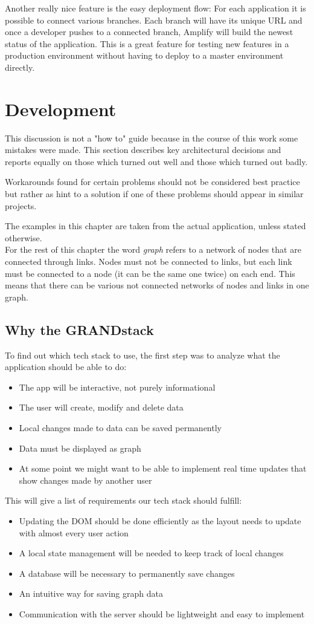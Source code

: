 Another really nice feature is the easy deployment flow: For each application it is possible to connect various branches. Each branch will have its unique URL and once a developer pushes to a connected branch, Amplify will build the newest status of the application. This is a great feature for testing new features in a production environment without having to deploy to a master environment directly.

\chapter{Development}
This discussion is not a "how to" guide because in the course of this work some mistakes were made. This section describes key architectural decisions and reports equally on those which turned out well and those which turned out badly.

Workarounds found for certain problems should not be considered best practice but rather as hint to a solution if one of these problems should appear in similar projects.

The examples in this chapter are taken from the actual application, unless stated otherwise. \\

For the rest of this chapter the word \emph{graph} refers to a network of nodes that are connected through links. Nodes must not be connected to links, but each link must be connected to a node (it can be the same one twice) on each end. This means that there can be various not connected networks of nodes and links in one graph.

\section{Why the GRANDstack}
To find out which tech stack to use, the first step was to analyze what the application should be able to do:
\begin{itemize}
\item The app will be interactive, not purely informational
\item The user will create, modify and delete data
\item Local changes made to data can be saved permanently
\item Data must be displayed as graph
\item At some point we might want to be able to implement real time updates that show changes made by another user
\end{itemize}
This will give a list of requirements our tech stack should fulfill:
\begin{itemize}
\item Updating the DOM should be done efficiently as the layout needs to update with almost every user action
\item A local state management will be needed to keep track of local changes
\item A database will be necessary to permanently save changes
\item An intuitive way for saving graph data
\item Communication with the server should be lightweight and easy to implement
\end{itemize}

